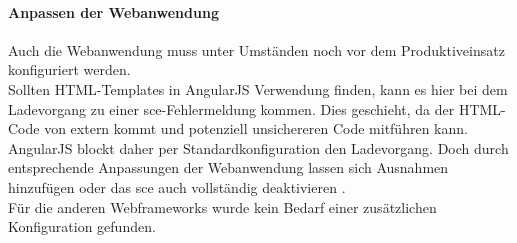 \paragraph{Anpassen der Webanwendung}
\label{sec:anpassen-der-webanwendung}
Auch die Webanwendung muss unter Umständen noch vor dem Produktiveinsatz konfiguriert werden. \\
Sollten HTML-Templates in AngularJS Verwendung finden, kann es hier bei dem Ladevorgang zu einer \ac{sce}-Fehlermeldung kommen. Dies geschieht, da der HTML-Code von extern kommt und potenziell unsichereren Code mitführen kann. AngularJS blockt daher per Standardkonfiguration den Ladevorgang. Doch durch entsprechende Anpassungen der Webanwendung lassen sich Ausnahmen hinzufügen oder das \ac{sce} auch vollständig deaktivieren \cite{Google2016d}. \\
Für die anderen Webframeworks wurde kein Bedarf einer zusätzlichen Konfiguration gefunden. 